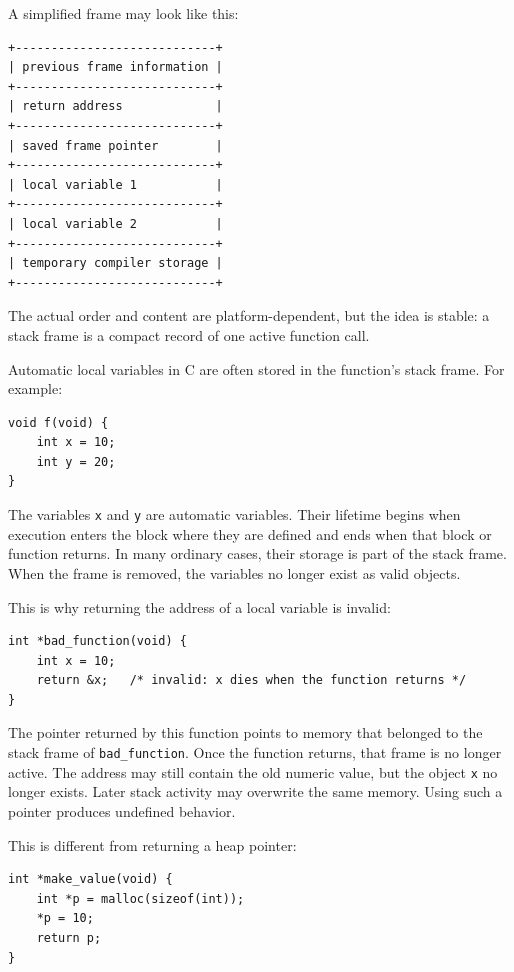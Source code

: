 A simplified frame may look like this:

\begin{verbatim}
+----------------------------+
| previous frame information |
+----------------------------+
| return address             |
+----------------------------+
| saved frame pointer        |
+----------------------------+
| local variable 1           |
+----------------------------+
| local variable 2           |
+----------------------------+
| temporary compiler storage |
+----------------------------+
\end{verbatim}

The actual order and content are platform-dependent, but the idea is stable: a stack frame is a compact record of one active function call.

Automatic local variables in C are often stored in the function's stack frame. For example:

\begin{verbatim}
void f(void) {
    int x = 10;
    int y = 20;
}
\end{verbatim}

The variables \texttt{x} and \texttt{y} are automatic variables. Their lifetime begins when execution enters the block where they are defined and ends when that block or function returns. In many ordinary cases, their storage is part of the stack frame. When the frame is removed, the variables no longer exist as valid objects.

This is why returning the address of a local variable is invalid:

\begin{verbatim}
int *bad_function(void) {
    int x = 10;
    return &x;   /* invalid: x dies when the function returns */
}
\end{verbatim}

The pointer returned by this function points to memory that belonged to the stack frame of \texttt{bad\_function}. Once the function returns, that frame is no longer active. The address may still contain the old numeric value, but the object \texttt{x} no longer exists. Later stack activity may overwrite the same memory. Using such a pointer produces undefined behavior.

This is different from returning a heap pointer:

\begin{verbatim}
int *make_value(void) {
    int *p = malloc(sizeof(int));
    *p = 10;
    return p;
}
\end{verbatim}

